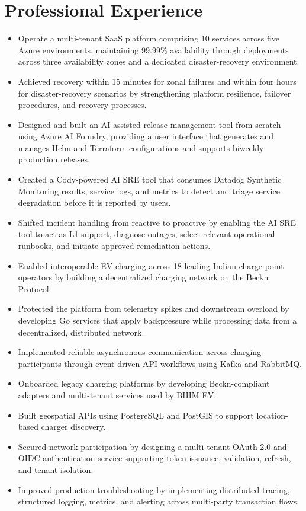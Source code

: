 \section{Professional Experience}

\begin{itemize}
  \item Operate a multi-tenant SaaS platform comprising 10 services across five Azure environments, maintaining 99.99\% availability through deployments across three availability zones and a dedicated disaster-recovery environment.
  \item Achieved recovery within 15 minutes for zonal failures and within four hours for disaster-recovery scenarios by strengthening platform resilience, failover procedures, and recovery processes.
  \item Designed and built an AI-assisted release-management tool from scratch using Azure AI Foundry, providing a user interface that generates and manages Helm and Terraform configurations and supports biweekly production releases.
  \item Created a Cody-powered AI SRE tool that consumes Datadog Synthetic Monitoring results, service logs, and metrics to detect and triage service degradation before it is reported by users.
  \item Shifted incident handling from reactive to proactive by enabling the AI SRE tool to act as L1 support, diagnose outages, select relevant operational runbooks, and initiate approved remediation actions.
\end{itemize}

\begin{itemize}
  \item Enabled interoperable EV charging across 18 leading Indian charge-point operators by building a decentralized charging network on the Beckn Protocol.
  \item Protected the platform from telemetry spikes and downstream overload by developing Go services that apply backpressure while processing data from a decentralized, distributed network.
  \item Implemented reliable asynchronous communication across charging participants through event-driven API workflows using Kafka and RabbitMQ.
  \item Onboarded legacy charging platforms by developing Beckn-compliant adapters and multi-tenant services used by BHIM EV.
  \item Built geospatial APIs using PostgreSQL and PostGIS to support location-based charger discovery.
  \item Secured network participation by designing a multi-tenant OAuth 2.0 and OIDC authentication service supporting token issuance, validation, refresh, and tenant isolation.
  \item Improved production troubleshooting by implementing distributed tracing, structured logging, metrics, and alerting across multi-party transaction flows.
\end{itemize}

